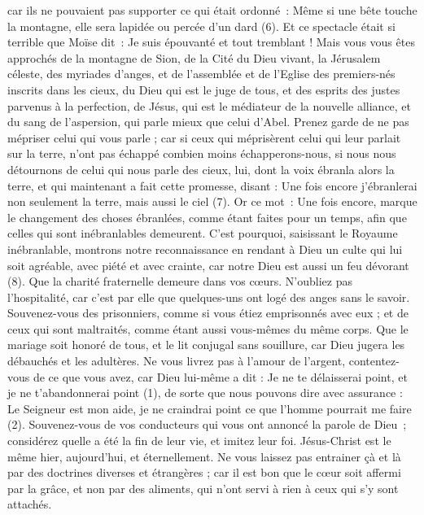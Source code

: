 \begin{multicols}{2}
car ils ne pouvaient pas supporter ce qui était ordonné : Même si une bête touche la montagne, elle sera lapidée ou percée d'un dard (6).
Et ce spectacle était si terrible que Moïse dit : Je suis épouvanté et tout tremblant !
Mais vous vous êtes approchés de la montagne de Sion, de la Cité du Dieu vivant, la Jérusalem céleste, des myriades d'anges,
et de l'assemblée et de l'Eglise des premiers-nés inscrits dans les cieux, du Dieu qui est le juge de tous, et des esprits des justes parvenus à la perfection,
de Jésus, qui est le médiateur de la nouvelle alliance, et du sang de l'aspersion, qui parle mieux que celui d'Abel.
Prenez garde de ne pas mépriser celui qui vous parle ; car si ceux qui méprisèrent celui qui leur parlait sur la terre, n’ont pas échappé combien moins échapperons-nous, si nous nous détournons de celui qui nous parle des cieux,
lui, dont la voix ébranla alors la terre, et qui maintenant a fait cette promesse, disant : Une fois encore j'ébranlerai non seulement la terre, mais aussi le ciel (7).
Or ce mot : Une fois encore, marque le changement des choses ébranlées, comme étant faites pour un temps, afin que celles qui sont inébranlables demeurent.
C'est pourquoi, saisissant le Royaume inébranlable, montrons notre reconnaissance en rendant à Dieu un culte qui lui soit agréable, avec piété et avec crainte,
car notre Dieu est aussi un feu dévorant (8).
\VerseOne{}Que la charité fraternelle demeure dans vos cœurs.
N'oubliez pas l'hospitalité, car c’est par elle que quelques-uns ont logé des anges sans le savoir.
Souvenez-vous des prisonniers, comme si vous étiez emprisonnés avec eux ; et de ceux qui sont maltraités, comme étant aussi vous-mêmes du même corps.
Que le mariage soit honoré de tous, et le lit conjugal sans souillure, car Dieu jugera les débauchés et les adultères.
Ne vous livrez pas à l’amour de l’argent, contentez-vous de ce que vous avez, car Dieu lui-même a dit : Je ne te délaisserai point, et je ne t'abandonnerai point (1),
de sorte que nous pouvons dire avec assurance : Le Seigneur est mon aide, je ne craindrai point ce que l'homme pourrait me faire (2).
Souvenez-vous de vos conducteurs qui vous ont annoncé la parole de Dieu ; considérez quelle a été la fin de leur vie, et imitez leur foi.
Jésus-Christ est le même hier, aujourd'hui, et éternellement.
Ne vous laissez pas entrainer çà et là par des doctrines diverses et étrangères ; car il est bon que le cœur soit affermi par la grâce, et non par des aliments, qui n'ont servi à rien à ceux qui s'y sont attachés.

\end{multicols}
